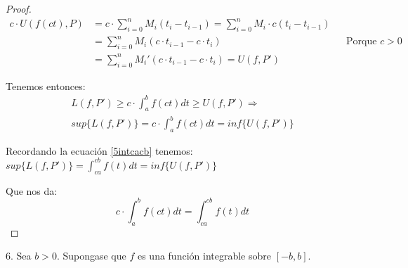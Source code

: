 \documentclass[12pt]{article}
\begin{document}
\begin{proof}
    \begin{align*}
        c\cdot U(f(ct),P) &= c \cdot \sum_{i=0}^n M_i(t_i-t_{i-1}) = \sum_{i=0}^n M_i\cdot c(t_i-t_{i-1}) \\
        &= \sum_{i=0}^n M_i(c\cdot t_{i-1}-c\cdot t_i) \quad &&\text{Porque $c>0$}\\
        &= \sum_{i=0}^n M_i'(c\cdot t_{i-1}-c\cdot t_i) = U(f,P')
    \end{align*}

    Tenemos entonces:
    \begin{multline*}
        L(f,P')\geq c\cdot\int_{a}^{b}f(ct)dt\geq U(f,P') \Longrightarrow \\ sup\{L(f,P')\}=c\cdot\int_{a}^{b}f(ct)dt=inf\{U(f,P')\}
    \end{multline*}

    Recordando la ecuaci\'on \eqref{5intcacb} tenemos: \(sup\{L(f,P')\}=\displaystyle\int_{ca}^{cb}f(t)dt=inf\{U(f,P')\}\)

    Que nos da:
    \begin{equation*}
        c\cdot\int_{a}^{b}f(ct)dt=\int_{ca}^{cb}f(t)dt
    \end{equation*}

\end{proof}

6. Sea $b>0$. Supongase que $f$ es una funci\'on integrable sobre $[-b,b]$.
\end{document}

